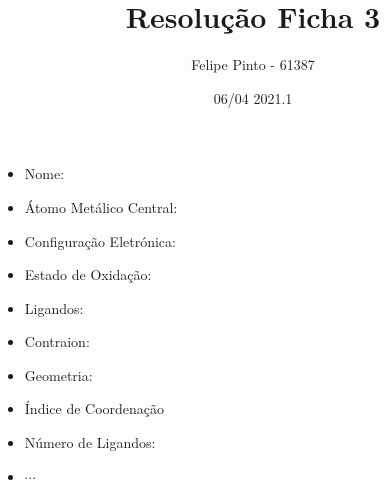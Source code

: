 \documentclass[12pt]{article}
\begin{document}
\title{Resolução Ficha 3}
\author{Felipe Pinto - 61387}
\date{06/04 2021.1}

\maketitle
\tableofcontents
\break

\section{}

\noindent\begin{minipage}{\textwidth}

   \subsection{}
   \noindent\begin{itemize}
   \item Nome: 
   \item Átomo Metálico Central:
   \item Configuração Eletrónica:
   \item Estado de Oxidação:
   \item Ligandos:
   \item Contraion:
   \item Geometria:
   \item Índice de Coordenação
   \item Número de Ligandos:
   \item $\cdots$
   \end{itemize}

\end{minipage}
\end{document}

